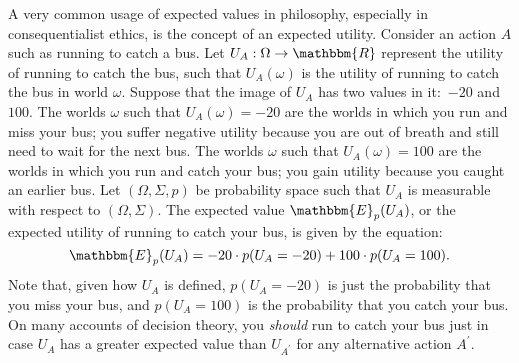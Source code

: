 \documentclass[11pt]{article}
\theoremstyle{definition}
\theoremstyle{remark}
\begin{document}
A very common usage of expected values in philosophy, especially in consequentialist ethics, is the concept of an expected utility. Consider an action $A$ such as running to catch a bus. Let $U_{A}:\Omega\rightarrow\mathbbm{R}$ represent the utility of running to catch the bus, such that $U_{A}(\omega)$ is the utility of running to catch the bus in world $\omega$. Suppose that the image of $U_{A}$ has two values in it:\ $-20$ and $100$. The worlds $\omega$ such that $U_{A}(\omega)=-20$ are the worlds in which you run and miss your bus; you suffer negative utility because you are out of breath and still need to wait for the next bus. The worlds $\omega$ such that $U_{A}(\omega)=100$ are the worlds in which you run and catch your bus; you gain utility because you caught an earlier bus. Let $(\Omega,\Sigma,p)$ be probability space such that $U_{A}$ is measurable with respect to $(\Omega,\Sigma)$. The expected value $\mathbbm{E}_{p}(U_{A})$, or the expected utility of running to catch your bus, is given by the equation:
$$\mathbbm{E}_{p}(U_{A})=-20\cdot p(U_{A}=-20) + 100\cdot p(U_{A}=100).$$
Note that, given how $U_{A}$ is defined, $p(U_{A}=-20)$ is just the probability that you miss your bus, and $p(U_{A}=100)$ is the probability that you catch your bus. On many accounts of decision theory, you \textit{should} run to catch your bus just in case $U_{A}$ has a greater expected value than $U_{A^{\prime}}$ for any alternative action $A^{\prime}$. 
\end{document}
